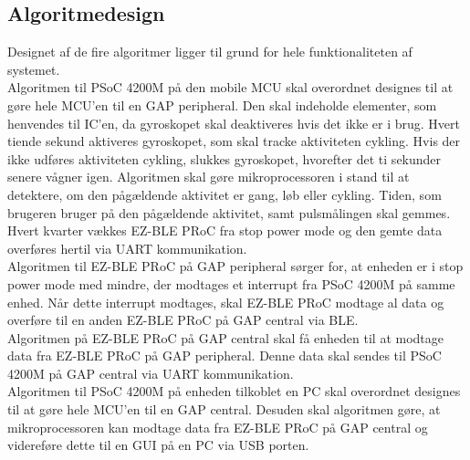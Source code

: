 \subsection{Algoritmedesign}
Designet af de fire algoritmer ligger til grund for hele funktionaliteten af systemet. \\
Algoritmen til PSoC 4200M på den mobile MCU skal overordnet designes til at gøre hele MCU'en til en GAP peripheral. Den skal indeholde elementer, som henvendes til IC'en, da gyroskopet skal deaktiveres hvis det ikke er i brug. Hvert tiende sekund aktiveres gyroskopet, som skal tracke aktiviteten cykling. Hvis der ikke udføres aktiviteten cykling, slukkes gyroskopet, hvorefter det ti sekunder senere vågner igen. Algoritmen skal gøre mikroprocessoren i stand til at detektere, om den pågældende aktivitet er gang, løb eller cykling. Tiden, som brugeren bruger på den pågældende aktivitet, samt pulsmålingen skal gemmes. Hvert kvarter vækkes EZ-BLE PRoC fra stop power mode og den gemte data overføres hertil via UART kommunikation.\\
Algoritmen til EZ-BLE PRoC på GAP peripheral sørger for, at enheden er i stop power mode med mindre, der modtages et interrupt fra PSoC 4200M på samme enhed. Når dette interrupt modtages, skal EZ-BLE PRoC modtage al data og overføre til en anden EZ-BLE PRoC på GAP central via BLE. \\
Algoritmen på EZ-BLE PRoC på GAP central skal få enheden til at modtage data fra EZ-BLE PRoC på GAP peripheral. Denne data skal sendes til PSoC 4200M på GAP central via UART kommunikation. \\
Algoritmen til PSoC 4200M på enheden tilkoblet en PC skal overordnet designes til at gøre hele MCU'en til en GAP central. Desuden skal algoritmen gøre, at mikroprocessoren kan modtage data fra EZ-BLE PRoC på GAP central og videreføre dette til en GUI på en PC via USB porten.

